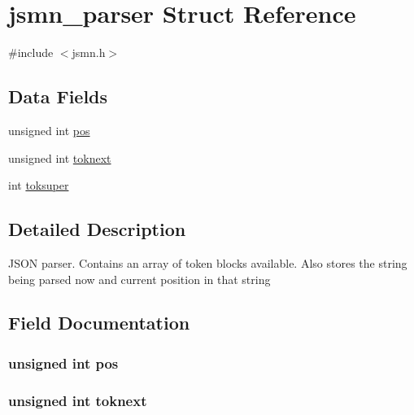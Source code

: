 \hypertarget{structjsmn__parser}{}\section{jsmn\+\_\+parser Struct Reference}
\label{structjsmn__parser}


{\ttfamily \#include $<$jsmn.\+h$>$}

\subsection*{Data Fields}
\begin{DoxyCompactItemize}
\item 
unsigned int \hyperlink{structjsmn__parser_addcb93d939ffa259ff1d9247bdd590fd}{pos}
\item 
unsigned int \hyperlink{structjsmn__parser_a07a43834d3e063cab9e9a69b37dc55b8}{toknext}
\item 
int \hyperlink{structjsmn__parser_a81bf640a522fb6791889aac12f71f8db}{toksuper}
\end{DoxyCompactItemize}


\subsection{Detailed Description}
J\+S\+ON parser. Contains an array of token blocks available. Also stores the string being parsed now and current position in that string 

\subsection{Field Documentation}
\subsubsection[{\texorpdfstring{pos}{pos}}]{\setlength{\rightskip}{0pt plus 5cm}unsigned int pos}\hypertarget{structjsmn__parser_addcb93d939ffa259ff1d9247bdd590fd}{}\label{structjsmn__parser_addcb93d939ffa259ff1d9247bdd590fd}
\subsubsection[{\texorpdfstring{toknext}{toknext}}]{\setlength{\rightskip}{0pt plus 5cm}unsigned int toknext}\hypertarget{structjsmn__parser_a07a43834d3e063cab9e9a69b37dc55b8}{}\label{structjsmn__parser_a07a43834d3e063cab9e9a69b37dc55b8}
